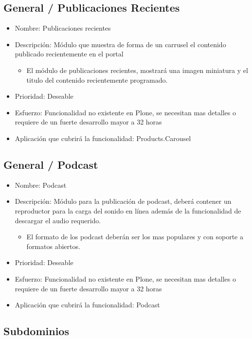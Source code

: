 \documentclass[11pt, letterpaper, oneside, spanish]{scrbook}
\begin{document}
\subsection{General / Publicaciones Recientes}
\label{sec-2-1-55}

\begin{itemize}
\item Nombre: Publicaciones recientes
\item Descripción: Módulo que muestra de forma de un carrusel el contenido
  publicado recientemente en el portal
\begin{itemize}
\item El módulo de publicaciones recientes, mostrará una imagen miniatura y el
    titulo del contenido recientemente programado.
\end{itemize}
\item Prioridad: Deseable
\item Esfuerzo: Funcionalidad no existente en Plone, se necesitan mas detalles o
  requiere de un fuerte desarrollo mayor a 32 horas
\item Aplicación que cubrirá la funcionalidad: Products.Carousel
\end{itemize}
\subsection{General / Podcast}
\label{sec-2-1-56}

\begin{itemize}
\item Nombre: Podcast
\item Descripción: Módulo para la publicación de podcast, deberá contener un
  reproductor para la carga del sonido en línea además de la funcionalidad de
  descargar el audio requerido.
\begin{itemize}
\item El formato de los podcast deberán ser los mas populares y con soporte a
    formatos abiertos.
\end{itemize}
\item Prioridad: Deseable
\item Esfuerzo: Funcionalidad no existente en Plone, se necesitan mas detalles o
  requiere de un fuerte desarrollo mayor a 32 horas
\item Aplicación que cubrirá la funcionalidad: Podcast
\end{itemize}
\subsection{Subdominios}
\label{sec-2-1-57}
\end{document}
